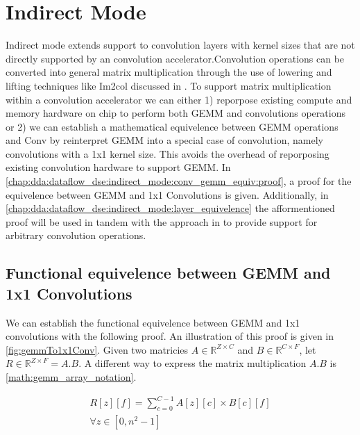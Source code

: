 \clearpage 

\section{Indirect Mode}
\label{chap:dda:dataflow_dse:indirect_mode}

Indirect mode extends support to convolution layers with kernel sizes that are
not directly supported by an convolution accelerator.Convolution operations can
be converted into general matrix multiplication through the use of lowering and
lifting techniques like Im2col discussed in \cite{cafe_con_troll}. To support
matrix multiplication within a convolution accelerator we can either 1)
reporpose existing compute and memory hardware on chip to perform both GEMM and
convolutions operations or 2) we can establish a mathematical equivelence
between GEMM operations and Conv by reinterpret GEMM into a special case of
convolution, namely convolutions with a 1x1 kernel size. This avoids the
overhead of reporposing existing convolution hardware to support GEMM. In
\autoref{chap:dda:dataflow_dse:indirect_mode:conv_gemm_equiv:proof}, a proof for
the equivelence between GEMM and 1x1 Convolutions is given. Additionally, in
\autoref{chap:dda:dataflow_dse:indirect_mode:layer_equivelence} the
afformentioned proof will be used in tandem with the approach in
\cite{cafe_con_troll} to provide support for arbitrary convolution operations. 

\clearpage

\subsection{Functional equivelence between GEMM and 1x1 Convolutions}
\label{chap:dda:dataflow_dse:indirect_mode:conv_gemm_equiv:proof}

We can establish the functional equivelence between GEMM and 1x1 convolutions with
the following proof. An illustration of this proof is given in
\autoref{fig:gemmTo1x1Conv}.  
Given two matricies $A\in \mathbb{R}^{Z \times C}$ and $B \in \mathbb{R}^{C
\times F}$, let $R \in \mathbb{R}^{Z\times F} = A.B$. A different way to express
the matrix multiplication $A.B$ is \autoref{math:gemm_array_notation}.  

\begin{equation}
    \begin{aligned}
        R[z][f] = \displaystyle\sum\limits_{c=0}^{C-1}A[z][c]\times B[c][f] \\ \forall z\in[0, n^2-1]
    \end{aligned}
    \label{math:gemm_array_notation}
\end{equation}

